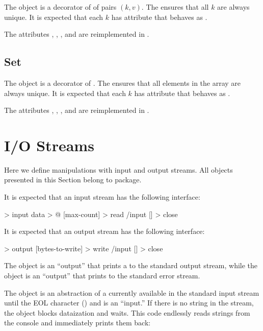 \documentclass[sigplan,11pt,nonacm,natbib=false]{acmart}
\newcommand\aff[1]{\ff{\textcolor{gray}{$\star$}#1}}
\newcommand\deff[1]{\ff{\textcolor{blue!50!black}{\textbf{#1}}}}
\newcommand\adeff[1]{\aff{\textcolor{blue!50!black}{\textbf{#1}}}}
\begin{document}
The object \deff{map} is a decorator of  of pairs $(k, v)$. The  ensures that all $k$ are always unique. It is expected that each $k$ has  attribute that behaves as .

The attributes , , , and  are reimplemented in .

\subsection{Set}

The object \deff{set} is a decorator of . The  ensures that all elements in the array are always unique. It is expected that each $k$ has  attribute that behaves as .

The attributes , , , and  are reimplemented in .

\section{I/O Streams}\label{sec:streams}

Here we define manipulations with input and output streams. All objects presented in this Section belong to  package.

It is expected that an input stream has the following interface:

\begin{ffcode}
[] > input
  data > @
  [max-count] > read /input
  [] > close
\end{ffcode}

It is expected that an output stream has the following interface:

\begin{ffcode}
[] > output
  [bytes-to-write] > write /input
  [] > close
\end{ffcode}

The object \adeff{stdout} is an ``output'' that prints a  to the standard output stream, while the object \adeff{stderr} is an ``output'' that prints to the standard error stream.

The object \adeff{stdin} is an abstraction of a  currently available in the standard input stream until the EOL character () and is an ``input.'' If there is no string in the stream, the object blocks dataization and waits. This code endlessly reads strings from the console and immediately prints them back:
\end{document}
